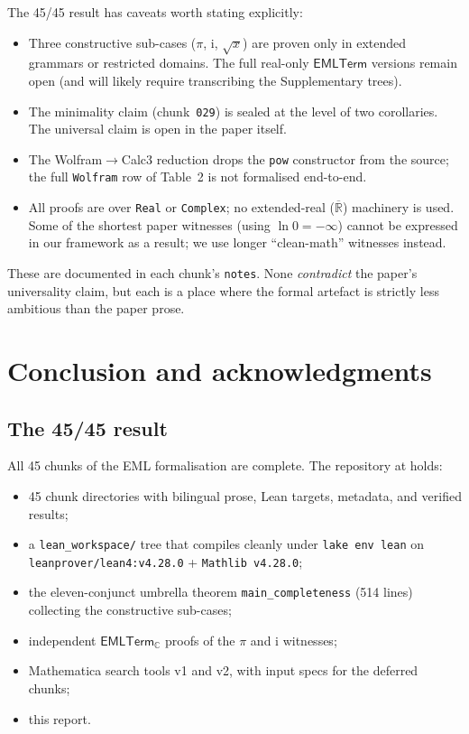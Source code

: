\documentclass[11pt,a4paper]{article}
\theoremstyle{plain}
\theoremstyle{definition}
\newcommand{\R}{\mathbb{R}}
\newcommand{\C}{\mathbb{C}}
\newcommand{\imu}{\mathrm{i}}
\newcommand{\EMLT}{\mathsf{EMLTerm}}
\newcommand{\EMLTC}{\mathsf{EMLTerm}_\C}
\begin{document}
The 45/45 result has caveats worth stating explicitly:

\begin{itemize}[leftmargin=*]
\item Three constructive sub-cases ($\pi$, $\imu$, $\sqrt{x}$) are
proven only in extended grammars or restricted domains.  The full real-only
$\EMLT$ versions remain open (and will likely require transcribing the
Supplementary trees).
\item The minimality claim (chunk~\texttt{029}) is sealed at the level
of two corollaries.  The universal claim is open in the paper itself.
\item The Wolfram$\to$Calc3 reduction drops the \texttt{pow}
constructor from the source; the full \texttt{Wolfram} row of Table~2
is not formalised end-to-end.
\item All proofs are over \texttt{Real} or \texttt{Complex}; no
extended-real ($\overline{\R}$) machinery is used.  Some of the
shortest paper witnesses (using $\ln 0 = -\infty$) cannot be expressed
in our framework as a result; we use longer ``clean-math'' witnesses
instead.
\end{itemize}

These are documented in each chunk's \texttt{notes}.  None
\emph{contradict} the paper's universality claim, but each is a place
where the formal artefact is strictly less ambitious than the paper
prose.

\section{Conclusion and acknowledgments}\label{sec:conclusion}

\subsection{The 45/45 result}

All 45 chunks of the EML formalisation are complete.  The repository at
 holds:
\begin{itemize}[leftmargin=*,nosep]
\item 45 chunk directories with bilingual prose, Lean targets,
metadata, and verified results;
\item a \texttt{lean\_workspace/} tree that compiles cleanly under
\texttt{lake env lean} on \texttt{leanprover/lean4:v4.28.0}
+ \texttt{Mathlib v4.28.0};
\item the eleven-conjunct umbrella theorem
\texttt{main\_completeness} (514 lines) collecting the constructive
sub-cases;
\item independent $\EMLTC$ proofs of the $\pi$ and
$\imu$ witnesses;
\item Mathematica search tools v1 and v2, with input specs for the
deferred chunks;
\item this report.
\end{itemize}
\end{document}
